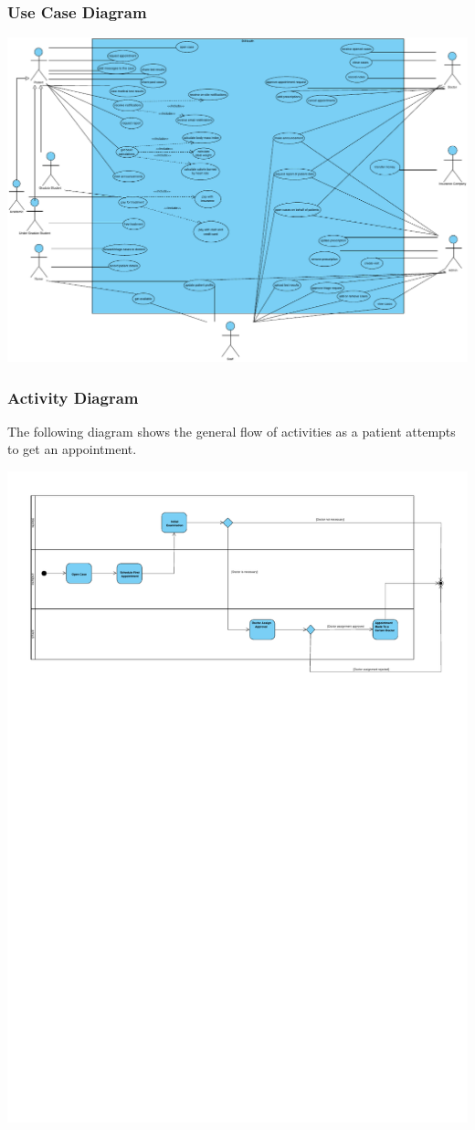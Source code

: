 \documentclass[a4paper, 12pt, titlepage]{article}
\begin{document}
  \subsubsection{Use Case Diagram}

  \includegraphics[width=\linewidth]{use_case_diag}

  \pagebreak
  \subsubsection{Activity Diagram}

  The following diagram shows the general flow of activities as a patient attempts to get an appointment.

  \includegraphics[width=\linewidth]{activity_diag_appointment}
\end{document}
